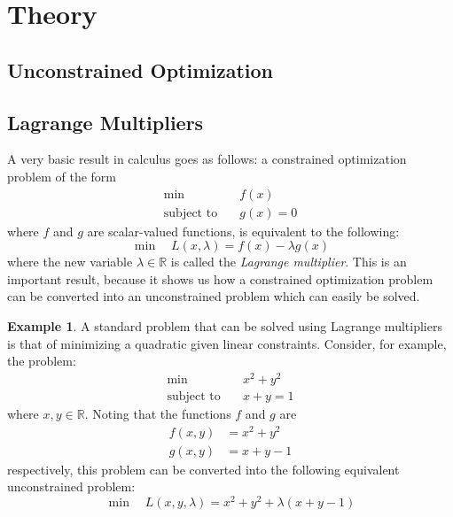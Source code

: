 \documentclass[a4paper]{article}
\theoremstyle{definition}
\newtheorem{example}{Example}[section]
\begin{document}
\section{Theory}

\subsection{Unconstrained Optimization}

\subsection{Lagrange Multipliers}

A very basic result in calculus goes as follows: a constrained optimization problem of the form
\begin{equation}
	\label{lagrange-constrained}
	\begin{aligned}
		\min \quad & f(x) \\
		\text{subject to} \quad & g(x) = 0
	\end{aligned}
\end{equation}
where $f$ and $g$ are scalar-valued functions, is equivalent to the following:
\begin{equation}
	\label{lagrange-unconstrained}
	\min \quad L(x, \lambda) = f(x) - \lambda g(x)
\end{equation}
where the new variable $\lambda \in \mathbb{R}$ is called the \textit{Lagrange multiplier}.
This is an important result, because it shows us how a constrained optimization problem can be converted into an unconstrained problem which can easily be solved.

\begin{example}
	A standard problem that can be solved using Lagrange multipliers is that of minimizing a quadratic given linear constraints.
	Consider, for example, the problem:
	\begin{equation*}
		\begin{aligned}
			\min \quad & x^2 + y^2 \\
			\text{subject to} \quad & x + y = 1
		\end{aligned}
	\end{equation*}
	where $x, y \in \mathbb{R}$.
	Noting that the functions $f$ and $g$ are
	\begin{align*}
		f(x, y) & = x^2 + y^2 \\
		g(x, y) & = x + y - 1
	\end{align*}
	respectively, this problem can be converted into the following equivalent unconstrained problem:
	\begin{equation*}
		\min \quad L(x, y, \lambda) = x^2 + y^2 + \lambda(x + y - 1)
	\end{equation*}
\end{example}
\end{document}
